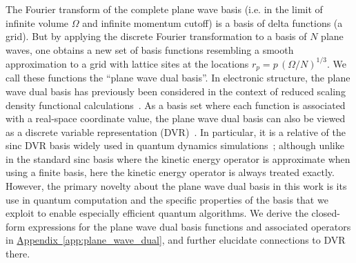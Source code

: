 \documentclass[superscriptaddress,aps,pra,nofootinbib,notitlepage,10pt,longbibliography]{revtex4-1}
\DeclareRobustCommand{\app}[1]{\hyperref[app:#1]{Appendix~\ref*{app:#1}}}
\begin{document}
The Fourier transform of the complete plane wave basis (i.e. in the limit of infinite volume $\Omega$ and infinite momentum cutoff) is a basis of delta functions (a grid). But by applying the discrete Fourier transformation to a basis of $N$ plane waves, one obtains a new set of basis functions resembling a smooth approximation to a grid with lattice sites at the locations $r_p = p\, (\Omega / N)^{1/3}$. We call these functions the ``plane wave dual basis''. In electronic structure, the plane wave dual basis has previously been considered
in the context of reduced scaling density functional calculations~\cite{skylaris2002nonorthogonal,skylaris2005introducing}.
As a basis set where each function is associated with a real-space coordinate value, the plane wave dual basis can 
also be viewed as a discrete variable representation (DVR)~\cite{dvrreview}. In particular, it is
a relative of the sinc DVR basis widely used in quantum dynamics simulations~\cite{lill1982discrete,shizgal1984discrete,colbert1992novel,Jones2016,dvrreview}; although unlike in the standard sinc basis where the kinetic energy operator is approximate when using a finite basis,
here the kinetic energy operator is always treated exactly. 
However, the primary novelty about the plane wave dual basis in this work is its use in quantum computation and the specific properties of the basis that we exploit to enable especially efficient quantum algorithms. We derive the closed-form expressions for the plane wave dual basis functions and associated operators in \app{plane_wave_dual}, and further elucidate connections to DVR there.
\end{document}
